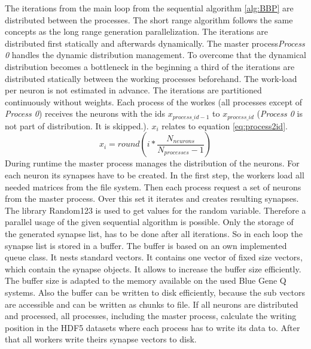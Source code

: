 The iterations from the main loop from the sequential algorithm \ref{alg:BBP} are distributed between the processes.
The short range algorithm follows the same concepts as the long range generation parallelization.
The iterations are distributed first statically and afterwards dynamically.
The master process\emph{Process 0} handles the dynamic distribution management.
To overcome that the dynamical distribution becomes a bottleneck in the beginning a third of the iterations are distributed
statically between the working processes beforehand.
The work-load per neuron is not estimated in advance.
The iterations are partitioned continuously without weights.
Each process of the workes (all processes except of \emph{Process 0}) receives the neurons with the ids $x_{process\_id-1}$
to $x_{process\_id}$ (\emph{Process 0} is not part of distribution. It is skipped.).
$x_i$ relates to equation \ref{eq:process2id}.
\begin{equation}
	x_i = round(i * \frac{N_{neurons}}{N_{processes}-1})
	\label{eq:process2id}
\end{equation}
During runtime the master process manages the distribution of the neurons. For each neuron 
its synapses have to be created. In the first step, the workers load all needed matrices from the file system.
Then each process request a set of neurons from the master process. Over this set it iterates and creates resulting
synapses. The library Random123 is used to get values for the random variable. Therefore a parallel usage of 
the given sequential algorithm is possible. Only the storage of the generated synapse list, has to be done 
after all iterations. So in each loop the synapse list is stored in a buffer.
The buffer is based on an own implemented queue class. It nests standard vectors.
It contains one vector of fixed size vectors, which contain the synapse objects.
It allows to increase the buffer size efficiently. The buffer size is adapted to 
the memory available on the used Blue Gene Q systems.
Also the buffer can be written to disk efficiently, because the sub vectors are
accessible and can be written as chunks to file.
If all neurons are distributed and processed, all processes, including the master process, calculate the writing position
in the HDF5 datasets where each process has to write its data to. After that all workers write theirs synapse vectors to
disk.




